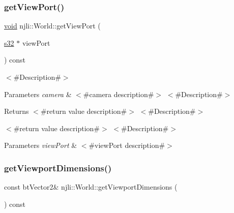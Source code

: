 \mbox{\label{classnjli_1_1_world_ab816a3e089fafc8fe7723723fb201bee}} 
\subsubsection{\texorpdfstring{get\+View\+Port()}{getViewPort()}}
{\footnotesize\ttfamily \mbox{\hyperlink{_thread_8h_af1e856da2e658414cb2456cb6f7ebc66}{void}} njli\+::\+World\+::get\+View\+Port (\begin{DoxyParamCaption}\item[{\mbox{\hyperlink{_util_8h_aa62c75d314a0d1f37f79c4b73b2292e2}{s32}} $\ast$}]{view\+Port }\end{DoxyParamCaption}) const}

$<$\#\+Description\#$>$


\begin{DoxyParams}{Parameters}
{\em camera} & $<$\#camera description\#$>$ $<$\#\+Description\#$>$\\
\hline
\end{DoxyParams}
\begin{DoxyReturn}{Returns}
$<$\#return value description\#$>$ $<$\#\+Description\#$>$

$<$\#return value description\#$>$ $<$\#\+Description\#$>$
\end{DoxyReturn}

\begin{DoxyParams}{Parameters}
{\em view\+Port} & $<$\#view\+Port description\#$>$ \\
\hline
\end{DoxyParams}
\mbox{\label{classnjli_1_1_world_a0d888d6664fed006bde6e9fd806bc41c}} 
\subsubsection{\texorpdfstring{get\+Viewport\+Dimensions()}{getViewportDimensions()}}
{\footnotesize\ttfamily const bt\+Vector2\& njli\+::\+World\+::get\+Viewport\+Dimensions (\begin{DoxyParamCaption}{ }\end{DoxyParamCaption}) const}

